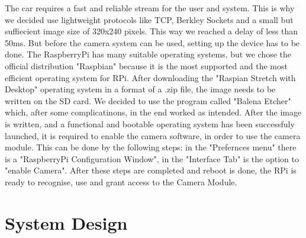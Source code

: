 \documentclass[conference]{IEEEtran}
\begin{document}
The car requires a fast and reliable stream for the user and system. This is why we decided use lightweight protocols like TCP, Berkley Sockets and a small but suffiecient image size of 320x240 pixels. This way we reached a delay of less than 50ms. But before the camera system can be used, setting up the device has to be done. The RaspberryPi has many suitable operating systems, but we chose the official distribution "Raspbian" because it is the most supported and the most efficient operating system for RPi. After downloading the "Raspian Stretch with Desktop" operating system in a format of a .zip file, the image needs to be written on the SD card. We decided to use the program called "Balena Etcher" which, after some complicatinons, in the end worked as intended. After the image is written, and a functional and bootable operating system has been successfuly launched, it is required to enable the camera software, in order to use the camera module. This can be done by the following steps: in the "Prefernces menu" there is a "RaspberryPi Configuration Window", in the "Interface Tab" is the option to "enable Camera". After these steps are completed and reboot is done, the RPi is ready to recognise, use and grant access to the Camera Module.

\section{System Design}
\end{document}

